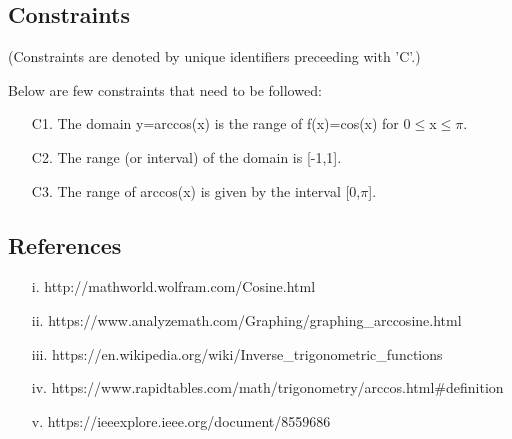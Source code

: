 \documentclass[12pt]{report}
\begin{document}
	\begin{flushleft}
		\subsection{Constraints}
		\small (Constraints are denoted by unique identifiers preceeding with 'C'.)
	\end{flushleft}
		Below are few constraints that need to be followed:
		\begin{itemize} 
			\item[C1.] The domain y=arccos(x) is the range of f(x)=cos(x) for 0$\leq$x$\leq$$\pi$.
			\item[C2.] The range (or interval) of the domain is [-1,1].
			\item[C3.] The range of arccos(x) is given by the interval [0,$\pi$].
		\end{itemize}
	
	\begin{center}
		\section{References}
	\end{center}
		\begin{enumerate}
			\item[i.] http://mathworld.wolfram.com/Cosine.html
			\item[ii.] https://www.analyzemath.com/Graphing/graphing\_arccosine.html
			\item[iii.] https://en.wikipedia.org/wiki/Inverse\_trigonometric\_functions
			\item[iv.] https://www.rapidtables.com/math/trigonometry/arccos.html\#definition
			\item[v.] https://ieeexplore.ieee.org/document/8559686
		\end{enumerate}
	
		
	
		
		
	
\end{document}
